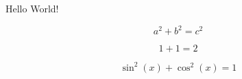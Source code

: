 \documentclass{article}
\begin{document}
Hello World!

$$a^2 + b^2 = c^2$$

\begin{equation} 
	1+1=2 
\end{equation}

\[
	\sin^2(x) + \cos^2(x) = 1
\]
\end{document}
